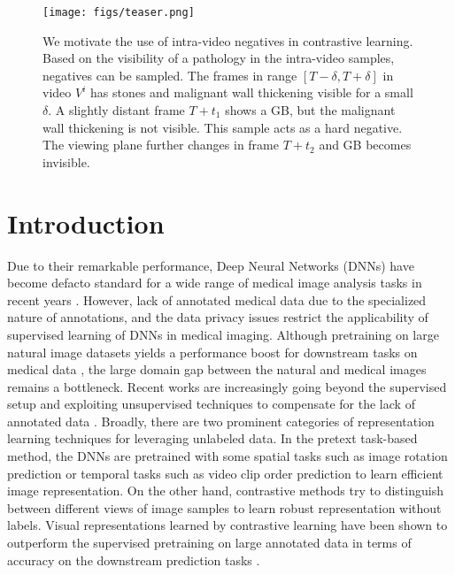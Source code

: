 \documentclass[runningheads]{llncs}
\begin{document}
\begin{figure}[t]
    \centering
    \texttt{[image: figs/teaser.png]}
    \caption{We motivate the use of intra-video negatives in contrastive learning. Based on the visibility of a pathology in the intra-video samples, negatives can be sampled. The frames in range $[T-\delta, T+\delta]$ in video $V^i$ has stones and malignant wall thickening visible for a small $\delta$. A slightly distant frame $T+t_1$ shows a GB, but the malignant wall thickening is not visible. This sample acts as a hard negative. The viewing plane further changes in frame $T+t_2$ and GB becomes invisible.}
    \label{fig:teaser}
\end{figure}

%
\section{Introduction}

Due to their remarkable performance, Deep Neural Networks (DNNs) have become defacto standard for a wide range of medical image analysis tasks in recent years \cite{ardila2019end,bejnordi2017diagnostic}. However, lack of annotated medical data due to the specialized nature of annotations, and the data privacy issues restrict the applicability of supervised learning of DNNs in medical imaging. Although pretraining on large natural image datasets yields a performance boost for downstream tasks on medical data \cite{alzubaidi2020transferlearning,cheng2017transfer}, the large domain gap between the natural and medical images remains a bottleneck. Recent works are increasingly going beyond the supervised setup and exploiting unsupervised techniques to compensate for the lack of annotated data \cite{simclr,moco}. Broadly, there are two prominent categories of representation learning techniques for leveraging unlabeled data. In the pretext task-based method, the DNNs are pretrained with some spatial tasks such as image rotation prediction \cite{komodakis2018unsupervised} or temporal tasks such as video clip order prediction \cite{xu2019self} to learn efficient image representation. On the other hand, contrastive methods \cite{simclr} try to distinguish between different views of image samples to learn robust representation without labels. Visual representations learned by contrastive learning have been shown to outperform the supervised pretraining on large annotated data in terms of accuracy on the downstream prediction tasks \cite{simclr,moco}.  
\end{document}
